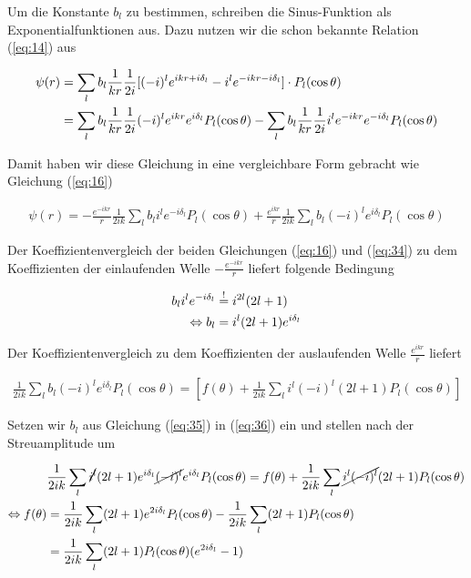 Um die Konstante \(b_l\) zu bestimmen, schreiben die Sinus-Funktion als Exponentialfunktionen aus. Dazu nutzen wir die schon bekannte Relation (\ref{eq:14}) aus

\begin{align}
  \label{eq:33}
   \psi(r) &= \sum_l b_l \frac{1}{kr} \frac{1}{2i}[ (-i)^l e^{ikr+i\delta_l} - i^l e^{-ikr-i\delta_l} ]   \cdot P_{l}(\cos\theta) \notag\\
&= \sum_l b_l \frac{1}{kr} \frac{1}{2i} (-i)^l e^{ikr}e^{i\delta_l}P_{l}(\cos\theta) - \sum_l b_l \frac{1}{kr} \frac{1}{2i} i^l e^{-ikr}e^{-i\delta_l}    P_{l}(\cos\theta) 
\end{align}

Damit haben wir diese Gleichung in eine vergleichbare Form gebracht wie Gleichung (\ref{eq:16})

\begin{align}
  \label{eq:34}
 \boxed{ \psi(r) = -  \frac{e^{-ikr}}{r} \frac{1}{2ik}\sum_l b_l  i^l e^{-i\delta_l}    P_{l}(\cos\theta) + \frac{e^{ikr}}{r} \frac{1}{2ik} \sum_l b_l (-i)^l e^{i\delta_l}P_{l}(\cos\theta) }
\end{align}

Der Koeffizientenvergleich der beiden Gleichungen (\ref{eq:16}) und (\ref{eq:34}) zu dem Koeffizienten der einlaufenden Welle \(-  \frac{e^{-ikr}}{r}\) liefert folgende Bedingung

\begin{align}
  \label{eq:35}
   b_l  i^l e^{-i\delta_l} &\stackrel{!}=  i^{2l}(2l+1)\notag\\
\Leftrightarrow b_l &= i^{l}(2l+1)e^{i\delta_l}
\end{align}

Der Koeffizientenvergleich zu dem Koeffizienten der auslaufenden Welle  \( \frac{e^{ikr}}{r}\) liefert

\begin{align}
  \label{eq:36}
\frac{1}{2ik} \sum_l b_l (-i)^l e^{i\delta_l}P_{l}(\cos\theta)  = \left[f(\theta) +  \frac{1}{2ik} \sum_{l}i^l(-i)^l(2l+1) P_l(\cos\theta)\right]
\end{align}

Setzen wir \(b_l\) aus Gleichung (\ref{eq:35}) in (\ref{eq:36}) ein und stellen nach der Streuamplitude um

\begin{align}
  \label{eq:37}
  &\frac{1}{2ik} \sum_l \cancel{i^{l}}(2l+1)e^{i\delta_l}\cancel{ (-i)^l} e^{i\delta_l}P_{l}(\cos\theta)  = f(\theta) +  \frac{1}{2ik} \sum_{l}\cancel{i^l(-i)^l}(2l+1) P_l(\cos\theta) \notag\\
\Leftrightarrow f(\theta) &= \frac{1}{2ik} \sum_l (2l+1) e^{2i\delta_l}P_{l}(\cos\theta) -  \frac{1}{2ik} \sum_{l}(2l+1) P_l(\cos\theta) \notag\\
&= \frac{1}{2ik} \sum_l  (2l+1)P_{l}(\cos\theta)(e^{2i\delta_l}-1)
\end{align}

